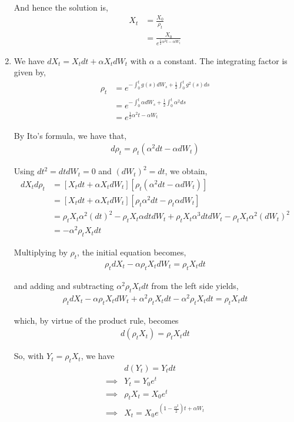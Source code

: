 \documentclass[12pt]{article}
\begin{document}
\begin{enumerate}[\alph*)]
And hence the solution is,
\begin{align*}
X_t &= \frac{X_0}{\rho_t}\\
&= \frac{X_0}{e^{\frac{1}{2} \alpha^2t - \alpha W_t}}
\end{align*}

\item We have $dX_t = X_t dt + \alpha X_t dW_t$ with $\alpha$ a constant. The integrating factor is given by,
\begin{align*}
\rho_t &= e^{-\int_0^t g(s) dW_s + \frac{1}{2}\int_0^t g^2(s) ds}\\
&= e^{-\int_0^t \alpha dW_s + \frac{1}{2}\int_0^t \alpha^2 ds}\\
&= e^{\frac{1}{2} \alpha^2t - \alpha W_t}
\end{align*}

By Ito's formula, we have that,
\begin{align*}
d\rho_t = \rho_t(\alpha^2 dt - \alpha dW_t)
\end{align*}

Using $dt^2 = dt dW_t = 0$ and $(dW_t)^2 = dt$, we obtain,
\begin{align*}
dX_td\rho_t &= [X_tdt + \alpha X_t dW_t][\rho_t(\alpha^2 dt - \alpha dW_t)]\\
&= [X_tdt + \alpha X_t dW_t][\rho_t \alpha^2 dt - \rho_t \alpha dW_t]\\
&=  \rho_t X_t \alpha^2 (dt)^2 - \rho_t X_t \alpha dt dW_t + \rho_t X_t \alpha^3 dt dW_t - \rho_t X_t \alpha^2 (dW_t)^2\\
&= - \alpha^2 \rho_t X_t dt
\end{align*}

Multiplying by $\rho_t$, the initial equation becomes,
\begin{align*}
\rho_tdX_t - \alpha\rho_tX_tdW_t = \rho_t X_t dt
\end{align*}

and adding and subtracting $\alpha^2\rho_tX_tdt$ from the left side yields,
\begin{align*}
\rho_tdX_t - \alpha\rho_tX_tdW_t + \alpha^2\rho_tX_tdt - \alpha^2\rho_tX_tdt = \rho_tX_t dt
\end{align*}

which, by virtue of the product rule, becomes
\begin{align*}
d(\rho_tX_t) = \rho_t X_t dt
\end{align*}

So, with $Y_t = \rho_tX_t$, we have
\begin{align*}
&d(Y_t) = Y_t dt\\
\implies &Y_t = Y_0e^t\\
\implies &\rho_tX_t = X_0e^t\\
\implies &X_t = X_0e^{(1 - \frac{\alpha^2}{2})t + \alpha W_t}
\end{align*}


\end{enumerate}
\end{document}
